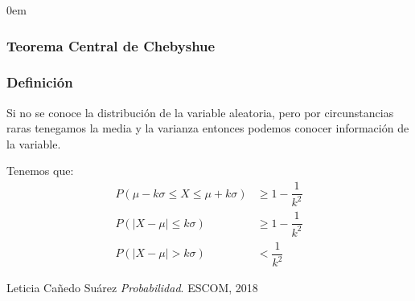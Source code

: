 \documentclass[12pt, fleqn]{report}                             %
\newenvironment{SmallIndentation}[1][0.75em]                    %
        {\begin{adjustwidth}{#1}{}\begin{footnotesize}}             %
        {\end{footnotesize}\end{adjustwidth}}                       %
\theoremstyle{break}                                            %
\begin{document}
\begin{multicols}{2}
\begin{SmallIndentation}[0em]
                    \subsubsection{Teorema Central de Chebyshue}

                        \subsubsection{Definición}

                            Si no se conoce la distribución de la variable aleatoria, pero por circunstancias
                            raras tenegamos la media y la varianza entonces podemos conocer información de
                            la variable.

                            
                            Tenemos que:
                            \begin{align*}
                                P(\mu -k\sigma \leq X \leq \mu + k\sigma) &\geq 1 - \dfrac{1}{k^2}      \\   
                                P(|X - \mu| \leq k\sigma) &\geq 1 - \dfrac{1}{k^2}                      \\   
                                P(|X - \mu| > k\sigma) &< \dfrac{1}{k^2}     
                            \end{align*}      


                \end{SmallIndentation}
                \end{multicols}







\begin{thebibliography}{10}

        Leticia Cañedo Suárez
        \textit{Probabilidad}. 
        ESCOM, 2018

\end{thebibliography}
\end{document}

